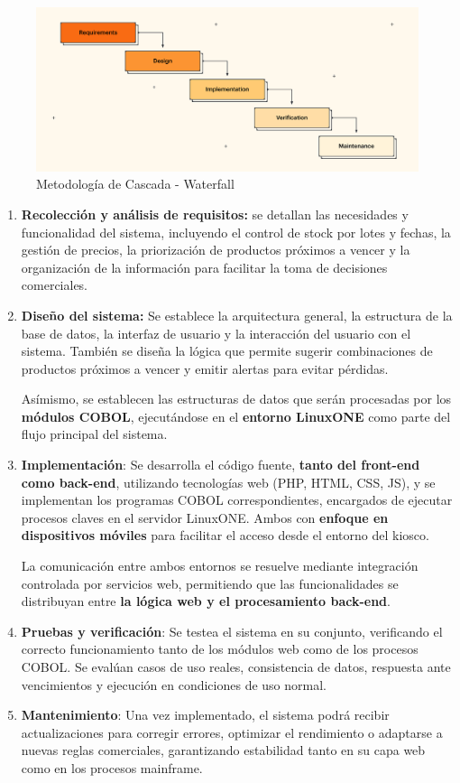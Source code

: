 \documentclass[twoside]{article}
\begin{document}
\begin{figure}[!h]
    \centering
    \includegraphics[scale=0.2]{WaterfallMethodologyBlogImage-2106.png}
    \caption{Metodología de Cascada - Waterfall}
    \label{fig:enter-label}
\end{figure}
\begin{enumerate}
	\item \textbf{Recolección y análisis de requisitos:} se detallan las necesidades y funcionalidad del sistema, incluyendo el control de stock por lotes y fechas, la gestión de precios, la priorización de productos próximos a vencer y la organización de la información para facilitar la toma de decisiones comerciales.
	\item \textbf{Diseño del sistema:} Se establece la arquitectura general, la estructura de la base de datos, la interfaz de usuario y la interacción del usuario con el sistema. También se diseña la lógica que permite sugerir combinaciones de productos próximos a vencer y emitir alertas para evitar pérdidas.\par
    \hspace{0.5cm} Asímismo, se establecen las estructuras de datos que serán procesadas por los \textbf{módulos COBOL}, ejecutándose en el \textbf{entorno LinuxONE} como parte del flujo principal del sistema.
	\item \textbf{Implementación}: Se desarrolla el código fuente, \textbf{tanto del front-end como back-end}, utilizando tecnologías web (PHP, HTML, CSS, JS), y se implementan los programas COBOL correspondientes, encargados de ejecutar procesos claves en el servidor LinuxONE. Ambos con \textbf{enfoque en dispositivos móviles} para facilitar el acceso desde el entorno del kiosco. \par
    \hspace{0.5cm} La comunicación entre ambos entornos se resuelve mediante integración controlada por servicios web, permitiendo que las funcionalidades se distribuyan entre \textbf{la lógica web y el procesamiento back-end}.
	\item \textbf{Pruebas y verificación}: Se testea el sistema en su conjunto, verificando el correcto funcionamiento tanto de los módulos web como de los procesos COBOL. Se evalúan casos de uso reales, consistencia de datos, respuesta ante vencimientos y ejecución en condiciones de uso normal.
	\item \textbf{Mantenimiento}: Una vez implementado, el sistema podrá recibir actualizaciones para corregir errores, optimizar el rendimiento o adaptarse a nuevas reglas comerciales, garantizando estabilidad tanto en su capa web como en los procesos mainframe.
\end{enumerate}
\end{document}

